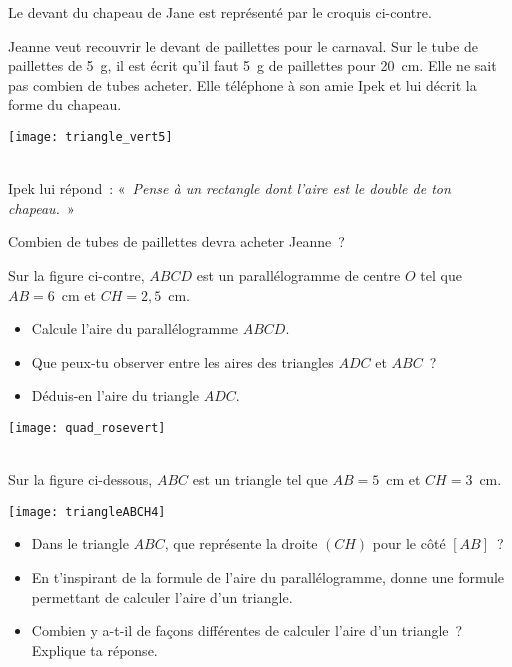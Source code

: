 \begin{activite}

\begin{partie}
\begin{minipage}[c]{0.56\linewidth}
Le devant du chapeau de Jane est représenté par le croquis ci-contre.

Jeanne veut recouvrir le devant de paillettes pour le carnaval. Sur le tube de paillettes de 5 g, il est écrit qu'il faut 5 g de paillettes pour 20 cm. Elle ne sait pas combien de tubes acheter. Elle téléphone à son amie Ipek et lui décrit la forme du chapeau.
 \end{minipage} \hfill%
 \begin{minipage}[c]{0.4\linewidth}
  \texttt{[image: triangle\_vert5]}
  \end{minipage} \\
  
Ipek lui répond : « \emph{Pense à un rectangle dont l'aire est le double de ton chapeau.} »

Combien de tubes de paillettes devra acheter Jeanne ?
\end{partie}

\begin{partie}
\begin{minipage}[c]{0.48\linewidth}
Sur la figure ci-contre, $ABCD$ est un parallélogramme de centre $O$ tel que $AB = 6$ cm et $CH = 2,5$ cm.
\begin{itemize}
 \item Calcule l'aire du parallélogramme $ABCD$.
 \item Que peux-tu observer entre les aires des triangles $ADC$ et $ABC$ ?
 \item Déduis-en l'aire du triangle $ADC$. 
 \end{itemize}
 \end{minipage} \hfill%
 \begin{minipage}[c]{0.48\linewidth}
  \texttt{[image: quad\_rosevert]}
  \end{minipage} \\[1em]
  Sur la figure ci-dessous, $ABC$ est un triangle tel que $AB = 5$ cm et $CH = 3$ cm. \\[1em]
  \begin{minipage}[c]{0.42\linewidth}
   \texttt{[image: triangleABCH4]} 
   \end{minipage} \hfill%
  \begin{minipage}[c]{0.54\linewidth}
  \begin{itemize}
  \item Dans le triangle $ABC$, que représente la droite $(CH)$ pour le côté $[AB]$ ?
  \item En t’inspirant de la formule de l’aire du parallélogramme, donne une formule permettant de calculer l’aire d’un triangle. 
  \item Combien y a-t-il de façons différentes de calculer l'aire d'un triangle ? Explique ta réponse.
  \end{itemize}
    \end{minipage} \\
\end{partie}


\end{activite}
